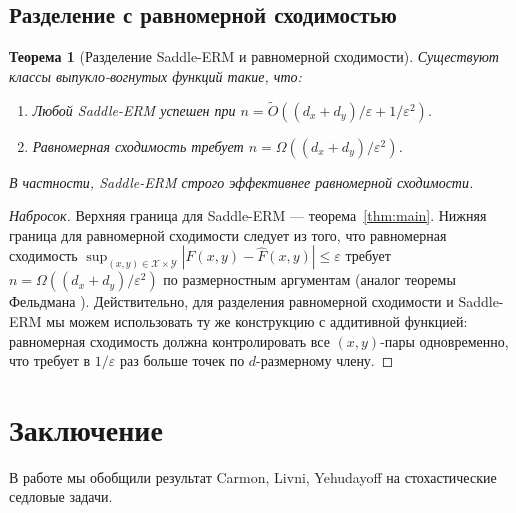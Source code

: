 \documentclass[12pt,a4paper]{article}
\theoremstyle{plain}
\newtheorem{theorem}{Теорема}[section]
\theoremstyle{definition}
\newcommand{\cX}{\mathcal{X}}
\newcommand{\cY}{\mathcal{Y}}
\newcommand{\hatF}{\hat{F}}
\begin{document}
\subsection{Разделение с равномерной сходимостью}

\begin{theorem}[Разделение Saddle-ERM и равномерной сходимости]
\label{thm:separation}
Существуют классы выпукло-вогнутых функций такие, что:
\begin{enumerate}
    \item Любой Saddle-ERM успешен при $n=\tilde{O}((d_x+d_y)/\varepsilon+1/\varepsilon^2)$.
    \item Равномерная сходимость требует $n=\Omega((d_x+d_y)/\varepsilon^2)$.
\end{enumerate}
В частности, Saddle-ERM строго эффективнее равномерной сходимости.
\end{theorem}

\begin{proof}[Набросок]
Верхняя граница для Saddle-ERM --- теорема~\ref{thm:main}. Нижняя граница для равномерной сходимости следует из того, что равномерная сходимость $\sup_{(x,y)\in\cX\times\cY}|F(x,y)-\hatF(x,y)|\le\varepsilon$ требует $n=\Omega((d_x+d_y)/\varepsilon^2)$ по размерностным аргументам (аналог теоремы Фельдмана \cite{Feldman2016}). Действительно, для разделения равномерной сходимости и Saddle-ERM мы можем использовать ту же конструкцию с аддитивной функцией: равномерная сходимость должна контролировать все $(x,y)$-пары одновременно, что требует в $1/\varepsilon$ раз больше точек по $d$-размерному члену.
\end{proof}

\section{Заключение}

В работе мы обобщили результат Carmon, Livni, Yehudayoff \cite{CLY2023} на стохастические седловые задачи.
\end{document}
